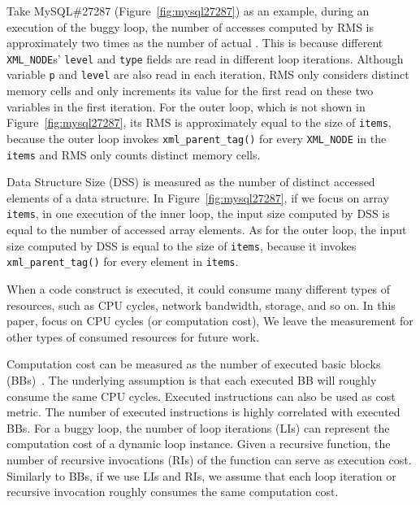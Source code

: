 Take MySQL\#27287 (Figure~\ref{fig:mysql27287}) as an example, 
during an execution of the buggy loop, the number of accesses
computed by RMS is approximately 
two times as the number of actual . 
This is because different \texttt{XML\_NODE}s' \texttt{level} and \texttt{type} 
fields are read in different loop iterations. 
Although variable \texttt{p} and \texttt{level} are also read in each iteration,
RMS only considers distinct memory cells and 
only increments its value for the first read on these 
two variables in the first iteration. 
For the outer loop, which is not shown in Figure~\ref{fig:mysql27287}, 
its RMS is approximately equal to the size of \texttt{items}, 
because the outer loop invokes \texttt{xml\_parent\_tag()} for every
\texttt{XML\_NODE} in the \texttt{items} and RMS only 
counts distinct memory cells. 


Data Structure Size (DSS) is measured as
the number of distinct accessed elements of a data structure.  
%
In Figure~\ref{fig:mysql27287}, if we focus on array \texttt{items},
in one execution of the inner loop, the input size computed by DSS 
is equal to the number of accessed array elements. 
As for the outer loop, the input size computed by DSS  is
equal to the size of  \texttt{items}, because
it invokes \texttt{xml\_parent\_tag()} for every element in \texttt{items}.


When a code construct is executed,
it could consume many different types of resources, 
such as CPU cycles, network bandwidth, storage, and so on.
In this paper, focus on CPU cycles (or computation cost), 
We leave the measurement for other types of 
consumed resources for future work.

Computation cost can be measured 
as the number of executed basic blocks (BBs)~\cite{Aprof1,Aprof2}.
The underlying assumption is that each executed 
BB will roughly consume the same CPU cycles. 
Executed instructions can also be used as cost metric. 
The number of executed instructions is highly correlated with executed BBs.
For a buggy loop, the number of loop iterations (LIs) can represent 
the computation cost of a dynamic loop instance.
Given a recursive function, the number of recursive invocations (RIs) 
of the function can serve as execution cost.
Similarly to BBs, if we use LIs and RIs, 
we assume that each loop iteration or recursive invocation 
roughly consumes the same computation cost. 



